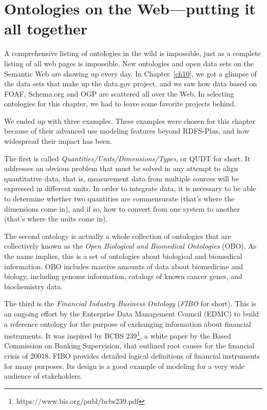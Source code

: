 \chapter{Ontologies on the Web---putting it all together}
\label{ch14}

A comprehensive listing of ontologies in the wild is impossible, just as
a complete listing of all web pages is impossible. New ontologies and
open data sets on the Semantic Web are showing up every day. In Chapter~\ref{ch10}, we got a glimpse of the data sets that make up the data.gov project,
and we saw how data based on FOAF, Schema.org and OGP are scattered all over the
Web. In selecting ontologies for this chapter, we had to leave some
favorite projects behind.

We ended up with three examples. These examples were chosen for this
chapter because of their advanced use modeling features beyond
RDFS-Plus, and how widespread their impact has been.


The first is called \emph{Quantities/Units/Dimensions/Types}, or QUDT for
short. It addresses an obvious problem that must be solved in any
attempt to align quantitative data, that is, measurement data from
multiple sources will be expressed in different units. In order to
integrate data, it is necessary to be able to determine whether two
quantities are commensurate (that's where the dimensions come in), and
if so, how to convert from one system to another (that's where the units
come in).

The second ontology is actually a whole collection of ontologies that are
collectively known as the \emph{Open Biological and Biomedical Ontologies}
(OBO). As the name implies, this is a set of ontologies about biological
and biomedical information.  OBO includes
massive amounts of data about biomedicine and biology, including genome
information, catalogs of known cancer genes, and biochemistry data.


The third is the \emph{Financial Industry Business Ontology} (\emph{FIBO} for short).
This is an ongoing effort by the Enterprise Data Management Council (EDMC) to 
build a reference ontology for the purpose of exchanging information about 
financial instruments.  It was inspired by
BCBS 239\footnote{https://www.bis.org/publ/bcbs239.pdf}, a white paper by the Based Commission 
on Banking Supervision, that outlined root causes for the financial crisis of
20018.  FIBO provides detailed logical definitions of financial instruments
for many purposes.  Its design is a good example of modeling for a very wide
audience of stakeholders. 


